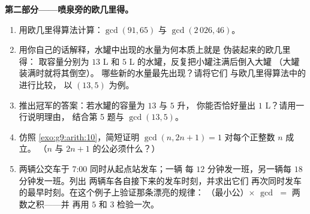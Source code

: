 \begin{problem}
\medskip
\noindent\textbf{第二部分——喷泉旁的欧几里得。}
\begin{enumerate}[resume]
  \item 用欧几里得算法计算：$\gcd(91, 65)$ 与
        $\gcd(2\,026, 46)$。
  \item 用你自己的话解释，水罐中出现的水量为何本质上就是
        伪装起来的欧几里得：
        取容量分别为 $13$ L 和 $5$ L 的水罐，反复把小罐注满后倒入大罐
        （大罐装满时就将其倒空）。
        哪些新的水量最先出现？请将它们
        与欧几里得算法中的进行比较，
        以 $(13, 5)$ 为例。
  \item 推出冠军的答案：若水罐的容量为 $13$ 与 $5$ 升，
        你能否恰好量出 $1$ L？请用一行说明理由，
        结合第 5 题与 $\gcd(13, 5)$。
  \item 仿照
        \cref{exo:g9:arith:10}，简短证明 $\gcd(n, 2n + 1) = 1$
        对每个正整数 $n$ 成立。
        （$n$ 与 $2n + 1$ 的公必须什么？）
  \item 两辆公交车于 7:00 同时从起点站发车；一辆
        每 $12$ 分钟发一班，另一辆每 $18$ 分钟发一班。列出
        两辆车各自接下来的发车时刻，并求出它们
        再次同时发车的最早时刻。在这个例子上验证那条漂亮的规律：
        （最小公）$\times$
        $\gcd$ $=$ 两数之积——并
        再用 $5$ 和 $3$ 检验一次。
\end{enumerate}


\end{problem}
